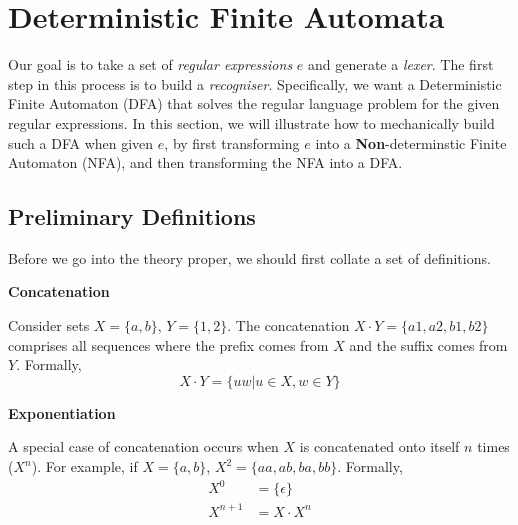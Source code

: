 \section{Deterministic Finite Automata}
Our goal is to take a set of \textit{regular expressions} $e$ and generate a \textit{lexer}. The first step in this process is to build a \textit{recogniser}. Specifically, we want a Deterministic Finite Automaton (DFA) that solves the regular language problem for the given regular expressions. In this section, we will illustrate how to mechanically build such a DFA when given $e$, by first transforming $e$ into a \textbf{Non}-determinstic Finite Automaton (NFA), and then transforming the NFA into a DFA.

\makeatletter

\def\*{\@postfix*}

\def\@postfix#1{{#1}\@ifnextchar){}{\;}}

\makeatother

\subsection{Preliminary Definitions}
Before we go into the theory proper, we should first collate a set of definitions. 

\begin{minipage}[t]{0.2\textwidth}
    \textbf{\textsf{Concatenation}}
\end{minipage}%
\begin{minipage}[t]{0.8\textwidth}
Consider sets $X = \{a, b\}$, $Y = \{1, 2\}$. The concatenation $X \cdot Y = \{a1, a2, b1, b2\}$ comprises all sequences where the prefix comes from $X$ and the suffix comes from $Y$. Formally, \[X \cdot Y = \{uw | u \in X, w \in Y \}\]
\end{minipage}\par

\begin{minipage}[t]{0.2\textwidth}
    \textbf{\textsf{Exponentiation}}
\end{minipage}%
\begin{minipage}[t]{0.8\textwidth}
A special case of concatenation occurs when $X$ is concatenated onto itself $n$ times ($X^n$). For example, if $X = \{a, b\}$, $X^2 = \{aa, ab, ba, bb\}$. Formally, 
\begin{align*}
    X^{0} &= \{ \epsilon \} \\
    X^{n+1} &= X \cdot X^n
\end{align*}
\end{minipage}\par

